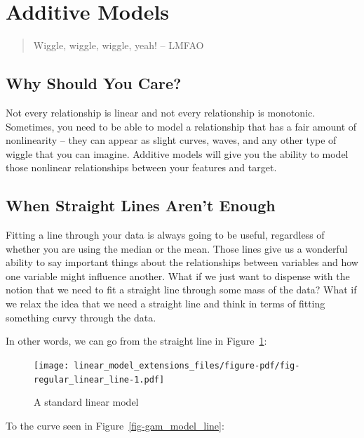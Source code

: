 \documentclass[
  letterpaper,
]{krantz}
\begin{document}
\section{Additive Models}\label{additive-models}

\begin{quote}
Wiggle, wiggle, wiggle, yeah! -- LMFAO
\end{quote}

\subsection{Why Should You Care?}\label{why-should-you-care-3}

Not every relationship is linear and not every relationship is
monotonic. Sometimes, you need to be able to model a relationship that
has a fair amount of nonlinearity -- they can appear as slight curves,
waves, and any other type of wiggle that you can imagine. Additive
models will give you the ability to model those nonlinear relationships
between your features and target.

\subsection{When Straight Lines Aren't
Enough}\label{when-straight-lines-arent-enough}

Fitting a line through your data is always going to be useful,
regardless of whether you are using the median or the mean. Those lines
give us a wonderful ability to say important things about the
relationships between variables and how one variable might influence
another. What if we just want to dispense with the notion that we need
to fit a straight line through some mass of the data? What if we relax
the idea that we need a straight line and think in terms of fitting
something curvy through the data.

In other words, we can go from the straight line in
Figure~\ref{fig-regular_linear_line}:

\begin{figure}

{\centering \texttt{[image: linear\_model\_extensions\_files/figure-pdf/fig-regular\_linear\_line-1.pdf]}

}

\caption{\label{fig-regular_linear_line}A standard linear model}

\end{figure}

To the curve seen in Figure~\ref{fig-gam_model_line}:
\end{document}
